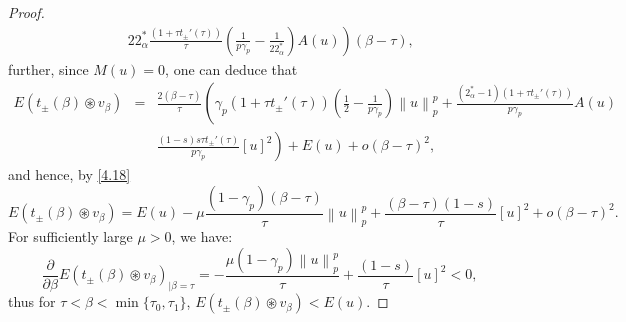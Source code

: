 \documentclass[10pt,a4paper]{amsart}
\begin{document}
\begin{proof}
\begin{eqnarray*}
				&& \left. 22^*_{\alpha}\frac{(1+\tau t_{\pm}'(\tau))}{\tau}\left(\frac{1}{p\gamma_p}-\frac{1}{22^*_{\alpha}}\right)A(u)\right)(\beta-\tau),
			\end{eqnarray*}
			further, since $M(u)=0$, one can deduce that
			\begin{eqnarray*}
				E(t_{\pm}(\beta)\circledast v_{\beta}) & = & \frac{2(\beta-\tau)}{\tau}\left(\gamma_p(1+\tau t_{\pm}'(\tau))\left(\frac{1}{2}-\frac{1}{p\gamma_p}\right)\left\| u \right\|_p^p+ \frac{(2^*_{\alpha}-1)(1+\tau t_{\pm}'(\tau))}{p\gamma_p}A(u)\right.\\
				&& \left. \frac{(1-s)s\tau t_{\pm}'(\tau)}{p\gamma_p}[u]^2\right)+ E(u)  +o(\beta-\tau)^2,
			\end{eqnarray*}
			and hence, by \eqref{4.18}
			$$E(t_{\pm}(\beta)\circledast v_{\beta}) = E(u)-\mu \frac{(1-\gamma_p)(\beta-\tau)}{\tau}\left\| u \right\|_p^p+\frac{(\beta-\tau)(1-s)}{\tau}[u]^2+o(\beta-\tau)^2.$$
			For sufficiently large $\mu>0$, we have:
			$$\frac{\partial}{\partial\beta}E(t_{\pm}(\beta)\circledast v_{\beta})_{|\beta=\tau}=-\frac{\mu (1-\gamma_p)\left\| u \right\|_p^p}{\tau}+\frac{(1-s)}{\tau}[u]^2<0,$$
			thus for $\tau<\beta<\min\{\tau_0,\tau_1\}$, $E(t_{\pm}(\beta)\circledast v_{\beta})<E(u)$.
		\end{proof}
\end{document}
